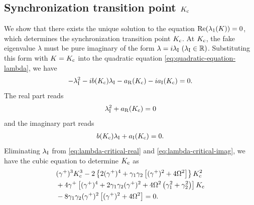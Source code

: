 \subsection{Synchronization transition point $K_{\rm c}$}
\label{sec:synchroniztion-transition-point}
We show that there exists the unique solution to
the equation ${\rm Re}(\lambda_{1}(K))=0$,
which determines the synchronization transition point $K_{\rm c}$.
At $K_{\rm c}$, the fake eigenvalue $\lambda$ must be
pure imaginary of the form
$\lambda=i\lambda_{\rm I}~(\lambda_{\rm I}\in\mathbb{R})$.
Substituting this form with $K=K_{\rm c}$ into the quadratic equation
\eqref{eq:quadratic-equation-lambda}, we have
\begin{align}
  -\lambda_{\rm I}^{2} - ib(K_{\rm c})\lambda_{\rm I}
  - a_{\rm R}(K_{\rm c}) - i a_{\rm I}(K_{\rm c}) = 0.
\end{align}
The real part reads
\begin{align}
  \lambda_{\rm I}^{2} + a_{\rm R}(K_{\rm c}) = 0
  \label{eq:lambda-critical-real}
\end{align}
and the imaginary part reads
\begin{align}
  b(K_{\rm c})\lambda_{\rm I} + a_{\rm I}(K_{\rm c}) = 0.
  \label{eq:lambda-critical-imag}
\end{align}
Eliminating $\lambda_{\rm I}$ from 
\eqref{eq:lambda-critical-real} and \eqref{eq:lambda-critical-imag},
we have the cubic equation to determine $K_{\rm c}$ as
\begin{align}
  \label{eq:kc-poly}
  \begin{aligned}
    & (\gamma^{+})^{3} K_{\rm c}^{3}
    - 2 \left\{ 2(\gamma^{+})^{4} + \gamma_{1}\gamma_{2}
      \left[ (\gamma^{+})^{2} + 4\Omega^{2} \right] \right\} K_{\rm c}^{2}\\
    & + 4\gamma^{+} \left[
      (\gamma^{+})^{4} + 2\gamma_{1}\gamma_{2}(\gamma^{+})^{2}
      + 4\Omega^{2}\left( \gamma_{1}^{2}+\gamma_{2}^{2} \right) \right] K_{\rm c} \\
    & -8\gamma_{1}\gamma_{2}(\gamma^{+})^{2} \left[
      (\gamma^{+})^{2}+4\Omega^{2} \right] = 0.
  \end{aligned}
\end{align}

